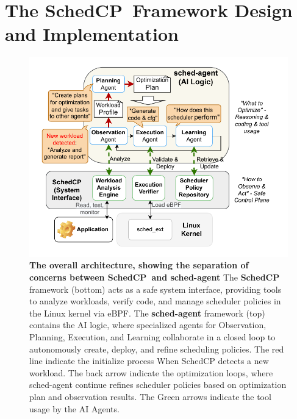 \documentclass[preprint]{article}
\newcommand{\sys}{SchedCP\xspace}
\newcommand{\agent}{sched-agent\xspace}
\begin{document}
\section{The \sys\ Framework Design and Implementation}
\label{sec:schedcp_framework}

\begin{figure}
    \centering
    \includegraphics[width=\columnwidth]{sections/img/arch-scheddcp.pdf}
    \caption{
        \textbf{The overall architecture, showing the separation of concerns between \sys\ and \agent } 
        The \textbf{\sys} framework (bottom) acts as a safe system interface, providing tools to analyze workloads, verify code, and manage scheduler policies in the Linux kernel via eBPF.
        The \textbf{\agent} framework (top) contains the AI logic, where specialized agents for Observation, Planning, Execution, and Learning collaborate in a closed loop to autonomously create, deploy, and refine scheduling policies. The red line indicate the initialize process When \sys detects a new workload. The back arrow indicate the optimization loops, where \agent continue refines scheduler policies based on optimization plan and observation results. The Green arrows indicate the tool usage by the AI Agents.
    }
    \label{fig:frameworkarch}
\end{figure}
\end{document}
